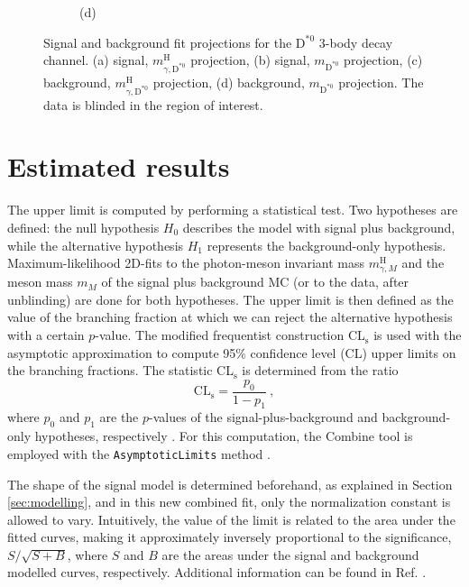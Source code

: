 \begin{figure}[!ht]
\begin{subfigure}[t]{0.50\mylength}
        \vspace*{-0.2cm}
        \caption{\footnotesize (d)}
    \end{subfigure}%
\caption{Signal and background fit projections for the $\text{D}^{*0}$ 3-body decay channel. (a) signal, $m^{\text{H}}_{\gamma, \text{D}^{*0}}$ projection, (b) signal, $m_{\text{D}^{*0}}$ projection, (c) background, $m^{\text{H}}_{\gamma, \text{D}^{*0}}$ projection, (d) background, $m_{\text{D}^{*0}}$ projection. The data is blinded in the region of interest.}
\label{fig:sig_bkg_modelling_d0star_3body}
    \vspace*{-0.0cm}
\end{figure}

\section{Estimated results}\label{sec:results}

The upper limit is computed by performing a statistical test. Two hypotheses are defined: the null hypothesis $H_0$ describes the model with signal plus background, while the alternative hypothesis $H_1$ represents the background-only hypothesis. Maximum-likelihood 2D-fits to the photon-meson invariant mass $m^{\text{H}}_{\gamma, M}$ and the meson mass $m_{M}$ of the signal plus background MC (or to the data, after unblinding) are done for both hypotheses. The upper limit is then defined as the value of the branching fraction at which we can reject the alternative hypothesis with a certain $p$-value. The modified frequentist construction CL$_\text{s}$ \cite{Read:2002hq, Junk:1999kv} is used with the asymptotic approximation \cite{Cowan:2010js} to compute 95\% confidence level (CL) upper limits on the branching fractions. The statistic CL$_\text{s}$ is determined from the ratio
\begin{equation*}
    \text{CL}_{\text{s}} = \frac{p_0}{1-p_1}\ ,
\end{equation*}
where $p_0$ and $p_1$ are the $p$-values of the signal-plus-background and background-only hypotheses, respectively \cite{PDG}. For this computation, the Combine tool is employed with the \verb+AsymptoticLimits+ method \cite{CMS:Combine}.

The shape of the signal model is determined beforehand, as explained in Section \ref{sec:modelling}, and in this new combined fit, only the normalization constant is allowed to vary. Intuitively, the value of the limit is related to the area under the fitted curves, making it approximately inversely proportional to the significance, $S/\sqrt{S+B}$, where $S$ and $B$ are the areas under the signal and background modelled curves, respectively. Additional information can be found in Ref. \cite{Cowan:2010js}.


